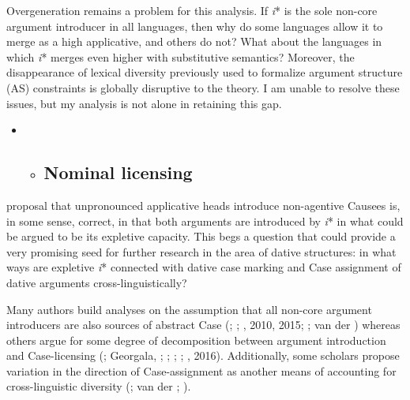 \documentclass[output=paper,modfonts,nonflat]{langsci/langscibook}
\begin{document}
Overgeneration remains a problem for this analysis. If \textit{i}* is the sole non-core argument introducer in all languages, then why do some languages allow it to merge as a high applicative, and others do not? What about the languages in which \textit{i}* merges even higher with substitutive semantics? Moreover, the disappearance of lexical diversity previously used to formalize argument structure (AS) constraints is globally disruptive to the theory. I am unable to resolve these issues, but my analysis is not alone in retaining this gap.

\begin{itemize}
\item \begin{itemize}
\item \subsection{Nominal licensing}
\end{itemize}
\end{itemize}
\begin{styleDefault}
 proposal that unpronounced applicative heads introduce non-agentive Causees is, in some sense, correct, in that both arguments are introduced by \textit{i}* in what could be argued to be its expletive capacity. This begs a question that could provide a very promising seed for further research in the area of dative structures: in what ways are expletive \textit{i}* connected with dative case marking and Case assignment of dative arguments cross-linguistically? 
\end{styleDefault}

\begin{styleDefault}
Many authors build analyses on the assumption that all non-core argument introducers are also sources of abstract Case (\citealt{MchomboFirmino1999}; \citealt{Jeong2007}; \citealt{Cuervo2003}, 2010, 2015; \citealt{Sheehan2013}; van der \citealt{Wal2017}) whereas others argue for some degree of decomposition between argument introduction and Case-licensing (\citealt{BakerCollins2006}; Georgala, \citealt{PaulWhitman2008}; \citealt{Georgala2012}; \citealt{HaddicanHolmberg2012}; \citealt{Halpert2012}; \citealt{Wechsler2014}, 2016). Additionally, some scholars propose variation in the direction of Case-assignment as another means of accounting for cross-linguistic diversity (\citealt{Sheehan2013}; van der \citealt{Wal2017}; \citealt{Baker2008}). 
\end{styleDefault}
\end{document}
